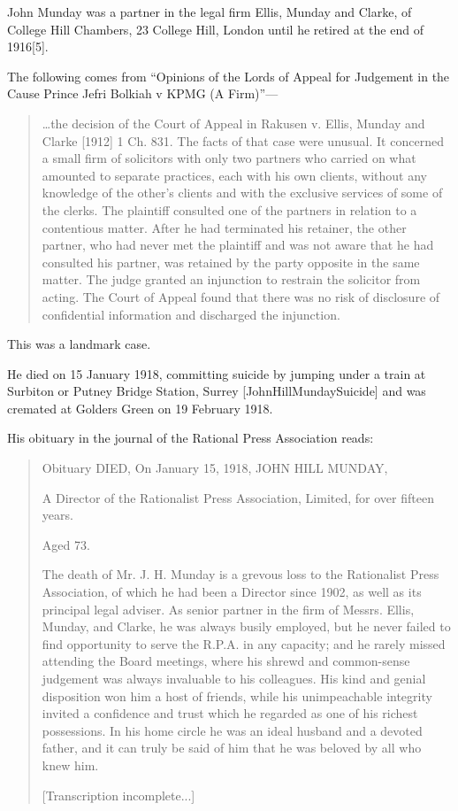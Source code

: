 John Munday was a partner in the legal firm Ellis, Munday and Clarke, of College Hill Chambers, 23 College Hill, London\cite{HeaddingtonMannor} until he retired at the end of 1916[5].

The following comes from ``Opinions of the Lords of Appeal for Judgement in the Cause Prince Jefri Bolkiah v KPMG (A Firm)''\cite{JohnHillMundayJudgement}---

\begin{quotation}
\dots the decision of the Court of Appeal in Rakusen v. Ellis, Munday and Clarke [1912] 1 Ch. 831. The facts of that case were unusual. It concerned a small firm of solicitors with only two partners who carried on what amounted to separate practices, each with his own clients, without any knowledge of the other's clients and with the exclusive services of some of the clerks. The plaintiff consulted one of the partners in relation to a contentious matter. After he had terminated his retainer, the other partner, who had never met the plaintiff and was not aware that he had consulted his partner, was retained by the party opposite in the same matter. The judge granted an injunction to restrain the solicitor from acting. The Court of Appeal found that there was no risk of disclosure of confidential information and discharged the injunction. 
\end{quotation}
This was a landmark case.\cite{JohnHillMundayJudgement}

He died on 15 January 1918, committing suicide by jumping under a train at Surbiton or Putney Bridge Station, Surrey [JohnHillMundaySuicide] and was cremated at Golders Green on 19 February 1918.


His obituary in the journal of the Rational Press Association reads:

\begin{quotation}
Obituary
DIED,
On January 15, 1918,
JOHN HILL MUNDAY,

A Director of the Rationalist Press Association, Limited, for over fifteen years.

Aged 73.

The death of Mr. J. H. Munday is a grevous loss to the Rationalist Press Association, of which he had been a Director since 1902, as well as its principal legal adviser. As senior partner in the firm of Messrs. Ellis, Munday, and Clarke, he was always busily employed, but he never failed to find opportunity to serve the R.P.A. in any capacity; and he rarely missed attending the Board meetings, where his shrewd and common-sense judgement was always invaluable to his colleagues. His kind and genial disposition won him a host of friends, while his unimpeachable integrity invited a confidence and trust which he regarded as one of his richest possessions. In his home circle he was an ideal husband and a devoted father, and it can truly be said of him that he was beloved by all who knew him.

[Transcription incomplete...]
\end{quotation}

